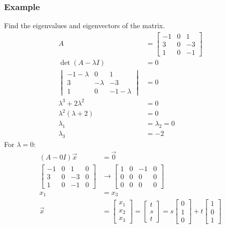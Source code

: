\documentclass{math}
\begin{document}
\subsubsection*{Example}
Find the eigenvalues and eigenvectors of the matrix.
\begin{align*}
  A &= \begin{bmatrix}
    -1 & 0 & 1 \\
    3 & 0 & -3 \\
    1 & 0 & -1
  \end{bmatrix} \\
  \det(A-\lambda I) &= 0 \\
  \begin{vmatrix}
    -1-\lambda & 0 & 1 \\
    3 & -\lambda & -3 \\
    1 & 0 & -1-\lambda
  \end{vmatrix} &= 0 \\
  \lambda^3+2\lambda^2 &= 0 \\
  \lambda^2(\lambda+2) &= 0 \\
  \lambda_1 &= \lambda_2 = 0 \\
  \lambda_3 &= -2
\end{align*}
For \( \lambda = 0 \):
\begin{align*}
  (A-0I)\vec{x} &= \vec{0} \\
  \begin{bmatrix}
    -1 & 0 & 1 & 0 \\
    3 & 0 & -3 & 0 \\
    1 & 0 & -1 & 0
  \end{bmatrix} &\to \begin{bmatrix}
    1 & 0 & -1 & 0 \\
    0 & 0 & 0 & 0 \\
    0 & 0 & 0 & 0
  \end{bmatrix} \\
  x_1 &= x_3 \\
  \vec{x} &= \begin{bmatrix}
    x_1 \\ x_2 \\ x_3
  \end{bmatrix} = \begin{bmatrix}
    t \\ s \\ t
  \end{bmatrix} = s\begin{bmatrix}
    0 \\ 1 \\ 0
  \end{bmatrix}+t\begin{bmatrix}
    1 \\ 0 \\ 1
  \end{bmatrix}
\end{align*}
\end{document}
